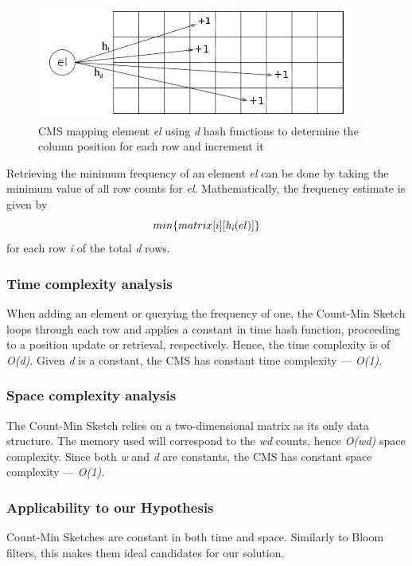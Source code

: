 \begin{figure}[!htb]
    \begin{center}
      \includegraphics[scale=0.8]{figures/cms.png}
      \caption[Count-Min Sketch update]{CMS mapping element \textit{el} using \textit{d} hash functions to determine the column position for each row and increment it}
      \label{fig:cms}
    \end{center}
\end{figure}

Retrieving the minimum frequency of an element \textit{el} can be done by taking the minimum value of all row counts for \textit{el}. Mathematically, the frequency estimate is given by
\[ min \{matrix[i][\textit{h\textsubscript{i}}(el)]\} \]
for each row \textit{i} of the total \textit{d} rows.    


\subsubsection{Time complexity analysis}
When adding an element or querying the frequency of one, the Count-Min Sketch loops through each row and applies a constant in time hash function, proceeding to a position update or retrieval, respectively. Hence, the time complexity is of \textit{O(d)}. Given \textit{d} is a constant, the CMS has constant time complexity --- \textit{O(1)}.

\subsubsection{Space complexity analysis}
The Count-Min Sketch relies on a two-dimensional matrix as its only data structure. The memory used will correspond to the \textit{wd} counts, hence \textit{O(wd)} space complexity. Since both \textit{w} and \textit{d} are constants, the CMS has constant space complexity --- \textit{O(1)}.

\subsubsection{Applicability to our Hypothesis}
Count-Min Sketches are constant in both time and space. Similarly to Bloom filters, this makes them ideal candidates for our solution. 

